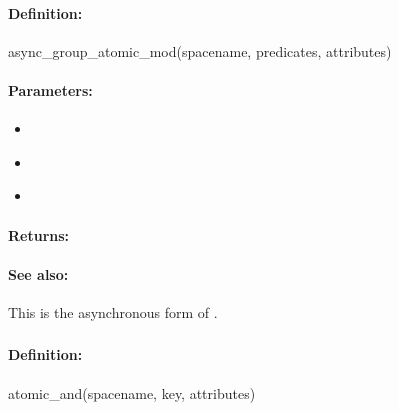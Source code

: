 \paragraph{Definition:}
\begin{rubycode}
async_group_atomic_mod(spacename, predicates, attributes)
\end{rubycode}

\paragraph{Parameters:}
\begin{itemize}[noitemsep]
\item {}\\

\item {}\\

\item {}\\

\end{itemize}

\paragraph{Returns:}


\paragraph{See also:}  This is the asynchronous form of .

\pagebreak
\subsubsection{}
\label{api:ruby:atomic_and}


\paragraph{Definition:}
\begin{rubycode}
atomic_and(spacename, key, attributes)
\end{rubycode}

